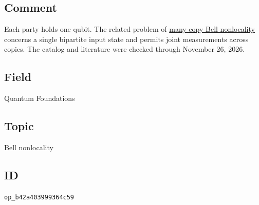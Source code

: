 \subsection*{Comment}

Each party holds one qubit. The related problem of \href{https://qiqc-op.com/problem/op_0e0ceaac739b74fd/}{many-copy Bell nonlocality} concerns a single bipartite input state and permits joint measurements across copies. The catalog and literature were checked through November 26, 2026.

\subsection*{Field}

Quantum Foundations

\subsection*{Topic}

Bell nonlocality

\subsection*{ID}

\texttt{op\_b42a403999364c59}

